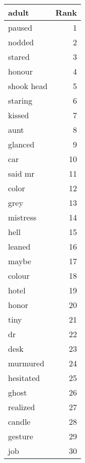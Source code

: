 \begin{table}
\label{tab:adult_terms}
\begin{tabular}{lr}
\toprule
adult & Rank \\
\midrule
paused & 1 \\
nodded & 2 \\
stared & 3 \\
honour & 4 \\
shook head & 5 \\
staring & 6 \\
kissed & 7 \\
aunt & 8 \\
glanced & 9 \\
car & 10 \\
said mr & 11 \\
color & 12 \\
grey & 13 \\
mistress & 14 \\
hell & 15 \\
leaned & 16 \\
maybe & 17 \\
colour & 18 \\
hotel & 19 \\
honor & 20 \\
tiny & 21 \\
dr & 22 \\
desk & 23 \\
murmured & 24 \\
hesitated & 25 \\
ghost & 26 \\
realized & 27 \\
candle & 28 \\
gesture & 29 \\
job & 30 \\
\bottomrule
\end{tabular}
\end{table}
